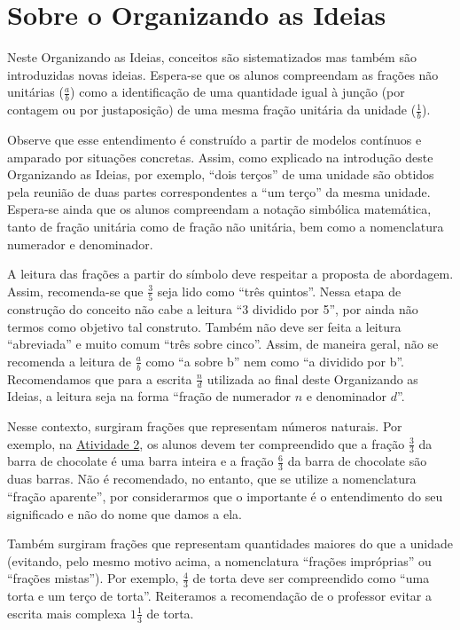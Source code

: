 \section{Sobre o Organizando as Ideias}
Neste Organizando as Ideias, conceitos são  sistematizados mas também são introduzidas novas ideias. Espera-se que os alunos compreendam as frações não unitárias ($\frac{a}{b}$) como a identificação de uma quantidade igual à junção (por contagem ou por justaposição) de uma mesma fração unitária da unidade ($\frac{1}{b}$). 

Observe que esse entendimento é construído a partir de modelos contínuos e amparado por situações concretas. Assim, como explicado na introdução deste Organizando as Ideias, por exemplo, ``dois terços'' de uma unidade são obtidos pela reunião de duas partes correspondentes a ``um terço'' da mesma unidade.
Espera-se ainda que os alunos compreendam a notação simbólica matemática, tanto de fração unitária como de fração não unitária, bem como a nomenclatura numerador e denominador. 

A leitura das frações a partir do símbolo deve respeitar a proposta de abordagem. Assim, recomenda-se que $\frac{3}{5}$ seja lido como ``três quintos''. Nessa etapa de construção do conceito não cabe a leitura ``3 dividido por 5'', por ainda não termos como objetivo tal construto.
Também não deve ser feita a leitura ``abreviada'' e muito comum ``três sobre cinco''. Assim, de maneira geral, não se recomenda a leitura de $\frac{a}{b}$ como ``a sobre b'' nem como ``a dividido por b''.
Recomendamos que para a escrita $\frac{n}{d}$ utilizada ao final deste Organizando as Ideias, a leitura seja na forma ``fração de numerador $n$ e denominador $d$''.

Nesse contexto, surgiram frações que representam números naturais. Por exemplo, na \hyperref[chap2-ativ2]{Atividade 2}, os alunos devem ter compreendido que a fração $\frac{3}{3}$ da barra de chocolate é uma barra inteira e a fração $\frac{6}{3}$ da barra de chocolate são duas barras. Não é recomendado, no entanto, que se utilize a nomenclatura ``fração aparente'', por considerarmos que o importante é o entendimento do seu significado e não do nome que damos a ela.

Também surgiram frações que representam quantidades maiores do que a unidade (evitando, pelo mesmo motivo acima, a nomenclatura ``frações impróprias'' ou ``frações mistas''). Por exemplo, $\frac{4}{3}$ de torta deve ser compreendido como ``uma torta e um terço de torta''. Reiteramos a recomendação de o professor evitar a escrita mais complexa $1 \frac{1}{3}$ de torta.

